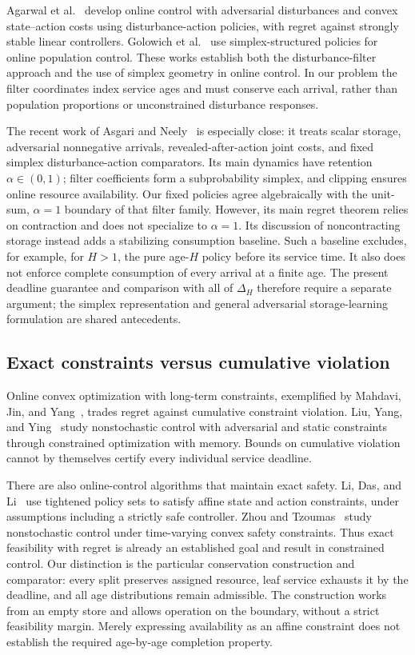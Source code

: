 \documentclass[11pt]{article}
\theoremstyle{plain}
\theoremstyle{remark}
\numberwithin{equation}{section}
\begin{document}
Agarwal et al.~\cite{agarwal2019online} develop online control with
adversarial disturbances and convex state--action costs using
disturbance-action policies, with regret against strongly stable linear
controllers. Golowich et al.~\cite{golowich2024population} use
simplex-structured policies for online population control. These works
establish both the disturbance-filter approach and the use of simplex
geometry in online control. In our problem the filter coordinates index
service ages and must conserve each arrival, rather than population
proportions or unconstrained disturbance responses.

The recent work of Asgari and Neely~\cite{asgari2026simplex} is especially
close: it treats scalar storage, adversarial nonnegative arrivals,
revealed-after-action joint costs, and fixed simplex disturbance-action
comparators. Its main dynamics have retention $\alpha\in(0,1)$; filter
coefficients form a subprobability simplex, and clipping ensures online
resource availability. Our fixed policies agree algebraically with the
unit-sum, $\alpha=1$ boundary of that filter family. However, its main
regret theorem relies on contraction and does not specialize to
$\alpha=1$. Its discussion of noncontracting storage instead adds a
stabilizing consumption baseline. Such a baseline excludes, for example,
for $H>1$, the pure age-$H$ policy before its service time. It also does not enforce
complete consumption of every arrival at a finite age. The present
deadline guarantee and comparison with all of $\Delta_H$ therefore
require a separate argument; the simplex representation and general
adversarial storage-learning formulation are shared antecedents.

\subsection{Exact constraints versus cumulative violation}

Online convex optimization with long-term constraints, exemplified by
Mahdavi, Jin, and Yang~\cite{mahdavi2012constraints}, trades regret against
cumulative constraint violation. Liu, Yang, and
Ying~\cite{liu2023constraints} study nonstochastic control with adversarial
and static constraints through constrained optimization with memory.
Bounds on cumulative violation cannot by themselves certify every
individual service deadline.

There are also online-control algorithms that maintain exact safety.
Li, Das, and Li~\cite{li2021affine} use tightened policy sets to satisfy
affine state and action constraints, under assumptions including a
strictly safe controller. Zhou and Tzoumas~\cite{zhou2023safe} study
nonstochastic control under time-varying convex safety constraints.
Thus exact feasibility with regret is already an established goal and
result in constrained control. Our distinction is the particular
conservation construction and comparator: every split preserves assigned
resource, leaf service exhausts it by the deadline, and all age
distributions remain admissible. The construction works from an empty
store and allows operation on the boundary, without a strict feasibility
margin. Merely expressing availability as an affine constraint does not
establish the required age-by-age completion property.
\end{document}

